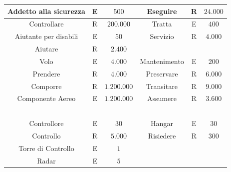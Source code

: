 \begin{tabular}{ | c  c  c | c  c  c | }
	\hline
	\textsf{\small Addetto alla sicurezza} & \textsf{\small E} & \textsf{\small $ 500 $} & \textsf{\small Eseguire} & \textsf{\small R} & \textsf{\small $ 24.000 $}\\
	\hline
	\textsf{\small Controllare} & \textsf{\small R} & \textsf{\small $ 200.000 $} & \textsf{\small Tratta} & \textsf{\small E} & \textsf{\small $ 400 $}\\
	\hline
	\textsf{\small Aiutante per disabili} & \textsf{\small E} & \textsf{\small $ 50 $} & \textsf{\small Servizio} & \textsf{\small R} & \textsf{\small $ 4.000 $}\\
	\hline
	\textsf{\small Aiutare} & \textsf{\small R} & \textsf{\small $ 2.400 $} & \textsf{\small } & \textsf{\small } & \textsf{\small $ $}\\
	\hline
	\textsf{\small Volo} & \textsf{\small E} & \textsf{\small $ 4.000 $} & \textsf{\small Mantenimento} & \textsf{\small E} & \textsf{\small $ 200 $}\\ %
	\hline
	\textsf{\small Prendere} & \textsf{\small R} & \textsf{\small $ 4.000 $} & \textsf{\small Preservare} & \textsf{\small R} & \textsf{\small $ 6.000 $}\\ %
	\hline
	\textsf{\small Comporre} & \textsf{\small R} & \textsf{\small $ 1.200.000 $} & \textsf{\small Transitare} & \textsf{\small R} & \textsf{\small $ 9.000 $}\\ %
	\hline
	\textsf{\small Componente Aereo} & \textsf{\small E} & \textsf{\small $ 1.200.000 $} & \textsf{\small Assumere} & \textsf{\small R} & \textsf{\small $ 3.600 $}\\ %
	\hline
	\textsf{\small } & \textsf{\small } & \textsf{\small $ $} & \textsf{\small } & \textsf{\small } & \textsf{\small $ $} \\
	\hline
	\textsf{\small Controllore} & \textsf{\small E} & \textsf{\small $ 30 $} & \textsf{\small Hangar} & \textsf{\small E} & \textsf{\small $ 30 $}\\
	\hline
	\textsf{\small Controllo} & \textsf{\small R} & \textsf{\small $ 5.000 $} & \textsf{\small Risiedere} & \textsf{\small R} & \textsf{\small $ 300 $}\\
	\hline
	\textsf{\small Torre di Controllo} & \textsf{\small E} & \textsf{\small $ 1 $} & \textsf{\small } & \textsf{\small } & \textsf{\small $ $}\\
	\hline
	\textsf{\small Radar} & \textsf{\small E} & \textsf{\small $ 5 $} & \textsf{\small } & \textsf{\small } & \textsf{\small $ $}\\

\end{tabular}
